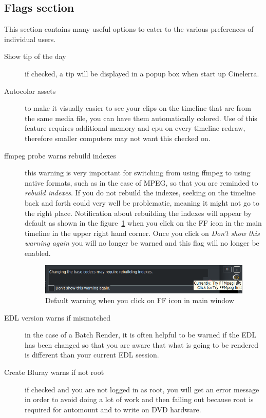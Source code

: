 \subsection{Flags section}%
\label{sub:flags_section}

This section contains many useful options to cater to the various preferences of individual users.

\begin{description}
    \item[Show tip of the day] if checked, a tip will be displayed in a popup box when start up Cinelerra.
    \item[Autocolor assets] to make it visually easier to see your clips on the timeline that are from the same media file, you can have them automatically colored. Use of this feature requires additional memory and cpu on every timeline redraw, therefore smaller computers may not want this checked on.
    \item[ffmpeg probe warns rebuild indexes] this warning is very important for switching from using ffmpeg to using native formats, such as in the case of MPEG, so that you are reminded to \textit{rebuild indexes}.  If you do not rebuild the indexes, seeking on the timeline back and forth could very well be problematic, meaning it might not go to the right place.  Notification about rebuilding the indexes will appear by default as shown in the figure~\ref{fig:ff_probe} when you click on the FF icon in the main timeline in the upper right hand corner.  Once you click on \textit{Don’t show this warning again} you will no longer be warned and this flag will no longer be enabled.
    \begin{figure}[htpb]
        \centering \includegraphics[width=0.7\linewidth]{images/ff_probe.png}
        \caption{Default warning when you click on FF icon in main window}
        \label{fig:ff_probe}
    \end{figure}
    \item[EDL version warns if mismatched] in the case of a Batch Render, it is often helpful to be warned if the EDL has been changed so that you are aware that what is going to be rendered is different than your current EDL session.
    \item[Create Bluray warns if not root] if checked and you are not logged in as root, you will get an error message in order to avoid doing a lot of work and then failing out because root is required for automount and to write on DVD hardware.

\end{description}
